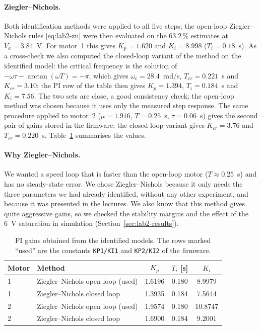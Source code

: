 \documentclass[english]{article}
\begin{document}
\paragraph{Ziegler--Nichols.} Both identification methods were applied to all five steps; the open-loop Ziegler--Nichols
rules \eqref{eq:lab2-zn} were then evaluated on the 63.2\,\% estimates at $V_a=3.84$~V. For motor~1 this gives
$K_p=1.620$ and $K_i=8.998$ ($T_i=0.18$~s). As a cross-check we also computed the closed-loop variant of the method
on the identified model: the critical frequency is the solution of $-\omega\tau-\arctan(\omega T)=-\pi$, which gives
$\omega_c=28.4$~rad/s, $T_{cr}=0.221$~s and $K_{cr}=3.10$; the PI row of the table then gives $K_p=1.394$,
$T_i=0.184$~s and $K_i=7.56$. The two sets are close, a good consistency check; the open-loop method was chosen
because it uses only the measured step response. The same procedure applied to motor~2 ($\mu=1.916$, $T=0.25$~s,
$\tau=0.06$~s) gives the second pair of gains stored in the firmware; the closed-loop variant gives $K_{cr}=3.76$ and
$T_{cr}=0.220$~s. Table~\ref{tab:lab2-gains} summarises the values.

\paragraph{Why Ziegler--Nichols.} We wanted a speed loop that is faster than the open-loop motor
($T\approx0.25$~s) and has no steady-state error. We chose Ziegler--Nichols because it only needs the three parameters
we had already identified, without any other experiment, and because it was presented in the lectures. We also know
that this method gives quite aggressive gains, so we checked the stability margins and the effect of the 6~V
saturation in simulation (Section~\ref{sec:lab2-results}).

\begin{table}[H]
  \centering
  \small
  \begin{tabular}{@{}llccc@{}}
    \toprule
    Motor & Method                            & $K_p$  & $T_i$ [s] & $K_i$   \\
    \midrule
    1     & Ziegler--Nichols open loop (used) & 1.6196 & 0.180     & 8.9979  \\
    1     & Ziegler--Nichols closed loop      & 1.3935 & 0.184     & 7.5644  \\
    2     & Ziegler--Nichols open loop (used) & 1.9574 & 0.180     & 10.8747 \\
    2     & Ziegler--Nichols closed loop      & 1.6900 & 0.184     & 9.2001  \\
    \bottomrule
  \end{tabular}
  \caption{PI gains obtained from the identified models. The rows marked ``used'' are the constants
    \texttt{KP1/KI1} and \texttt{KP2/KI2} of the firmware.}
  \label{tab:lab2-gains}
\end{table}
\end{document}
